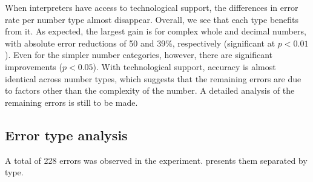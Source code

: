 \documentclass[output=paper]{langsci/langscibook}
\begin{document}
When interpreters have access to technological support, the differences in error rate per number type almost disappear. Overall, we see that each type benefits from it. As expected, the largest gain is for complex whole and decimal numbers, with absolute error reductions of 50 and 39\%, respectively (significant at $p < 0.01$). Even for the simpler number categories, however, there are significant improvements ($p < 0.05$). With technological support, accuracy is almost identical across number types, which suggests that the remaining errors are due to factors other than the complexity of the number. A detailed analysis of the remaining errors is still to be made.   

\subsection{Error type analysis}

A total of 228 errors was observed in the experiment.  presents them separated by type.
\end{document}
